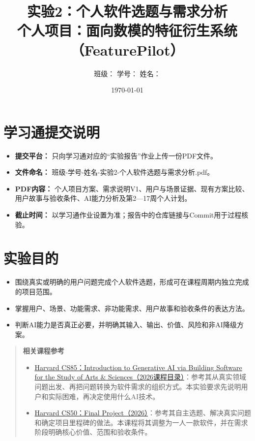 \documentclass[UTF8,12pt,a4paper]{ctexart}
\title{实验2：个人软件选题与需求分析\\[0.5em]
\large 个人项目：面向数模的特征衍生系统（FeaturePilot）}
\author{班级：\underline{\hspace{3cm}}\quad
学号：\underline{\hspace{3cm}}\quad
姓名：\underline{\hspace{2.5cm}}}
\date{\today}
\begin{document}
\maketitle
\tableofcontents
\newpage

\section*{学习通提交说明}

\begin{itemize}
  \item \textbf{提交平台：} 只向学习通对应的“实验报告”作业上传一份PDF文件。
  \item \textbf{文件命名：} 班级-学号-姓名-实验2-个人软件选题与需求分析.pdf。
  \item \textbf{PDF内容：} 个人项目方案、需求说明V1、用户与场景证据、现有方案比较、用户故事与验收条件、AI能力分析及第2—17周个人计划。
  \item \textbf{截止时间：} 以学习通作业设置为准；报告中的仓库链接与Commit用于过程核验。
\end{itemize}

\section{实验目的}

\begin{itemize}
  \item 围绕真实或明确的用户问题完成个人软件选题，形成可在课程周期内独立完成的项目范围。
  \item 掌握用户、场景、功能需求、非功能需求、用户故事和验收条件的表达方法。
  \item 判断AI能力是否真正必要，并明确其输入、输出、价值、风险和非AI降级方案。
\end{itemize}

\begin{quote}
\textbf{相关课程参考}

\begin{itemize}
  \item \href{https://seas.harvard.edu/computer-science/courses}{Harvard CS85：Introduction to Generative AI via Building Software for the Study of Arts \& Sciences（2026课程目录）}：参考其从真实领域问题出发、再把问题转换为软件需求的组织方式。本实验要求先说明用户和实际困难，再决定使用什么AI技术。
  \item \href{https://cs50.harvard.edu/x/2026/project/}{Harvard CS50：Final Project（2026）}：参考其自主选题、解决真实问题和确定项目里程碑的做法。本课程将其调整为一人一款软件，并在需求阶段明确核心价值、范围和验收条件。
\end{itemize}
\end{quote}
\end{document}
